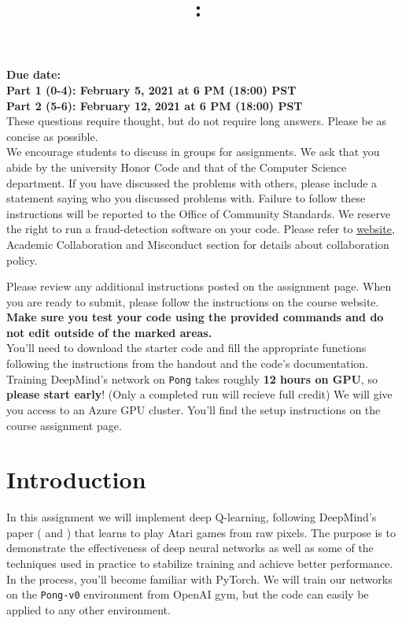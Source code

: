 \documentclass{article}
\title{
\vspace{-1in}
\textmd{\textbf{\hmwkClass:\ \hmwkTitle}}}
\author{}
\date{} %
\begin{document}
\maketitle
\vspace{-.5in}
\begin{framed}
{\bf Due date: \\
Part 1 (0-4): February 5, 2021 at 6 PM (18:00) PST\\
Part 2 (5-6): February 12, 2021 at 6 PM (18:00) PST}
\\[1em]
These questions require thought, but do not require long answers. Please be as concise as possible.
\\[1em]
We encourage students to discuss in groups for assignments. We ask
that you abide by the university Honor Code and that of the Computer Science department. If you have discussed the problems with others,
please include a statement saying who you discussed problems with. Failure to follow these instructions
will be reported to the Office of Community Standards. We reserve the right to run a fraud-detection software on your code. Please refer to \href{http://web.stanford.edu/class/cs234/index.html}{website}, Academic Collaboration and Misconduct section for details about collaboration policy.


Please review any additional instructions posted on the assignment page. When you are ready to submit, please
follow the instructions on the course website. \textbf{Make sure you test your code using the
provided commands and do not edit outside of the marked areas.}
\\[1em]
You'll need to download the starter code and fill the appropriate functions following the instructions from the handout and the code's documentation. Training DeepMind's network on \texttt{Pong} takes roughly \textbf{12 hours on GPU}, so \textbf{please start early}! (Only a completed run will recieve full credit) We will give you access to an Azure GPU cluster. You'll find the setup instructions on the course assignment page.
\end{framed}
\section*{Introduction}

In this assignment we will implement deep Q-learning, following DeepMind's paper (\cite{mnih2015human} and \cite{mnih-atari-2013}) that learns to play Atari games from raw pixels. The purpose is to demonstrate the effectiveness of deep neural networks as well as some of the techniques used in practice to stabilize training and achieve better performance. In the process, you'll become familiar with PyTorch. We will train our networks on the \texttt{Pong-v0} environment from OpenAI gym, but the code can easily be applied to any other environment. \\
\end{document}
